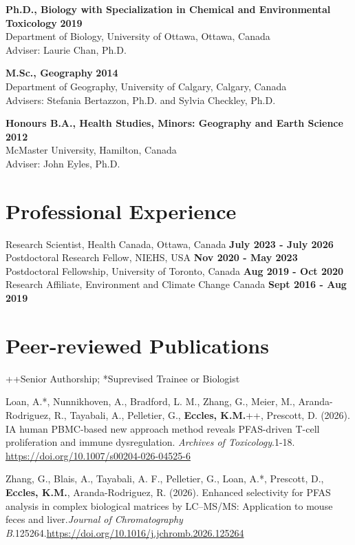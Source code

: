 \documentclass[margin,line]{res}
\begin{document}
\begin{resume}
\textbf{Ph.D., Biology with Specialization in Chemical and Environmental Toxicology} \hfill {\bf 2019}\\
Department of Biology, University of Ottawa, Ottawa, Canada \\
Adviser: Laurie Chan, Ph.D.

\textbf{M.Sc., Geography}  \hfill {\bf 2014}\\
Department of Geography, University of Calgary, Calgary, Canada\\
Advisers:  Stefania Bertazzon, Ph.D. and Sylvia Checkley, Ph.D.

\textbf{Honours B.A., Health Studies, Minors: Geography and Earth Science }\hfill {\bf 2012}\\
McMaster University, Hamilton, Canada\\
Adviser: John Eyles, Ph.D.

\vspace*{.1in}
\section{\sc Professional Experience}
Research Scientist, Health Canada, Ottawa, Canada \hfill {\bf July 2023 - July 2026}\\
Postdoctoral Research Fellow, NIEHS, USA \hfill {\bf Nov 2020 - May 2023}\\
Postdoctoral Fellowship, University of Toronto, Canada \hfill {\bf Aug 2019 - Oct 2020}\\
Research Affiliate, Environment and Climate Change Canada \hfill {\bf Sept 2016 - Aug 2019}\\

\section{\sc Peer-reviewed Publications}

++Senior Authorship; *Suprevised Trainee or Biologist

Loan, A.*, Nunnikhoven, A., Bradford, L. M., Zhang, G., Meier, M., Aranda-Rodriguez, R., Tayabali, A., Pelletier,
G., \textbf{Eccles, K.M.}++, Prescott, D. (2026). IA human PBMC-based new approach method reveals PFAS-driven T-cell proliferation and immune dysregulation. \textit{Archives of Toxicology}.1-18. \url{https://doi.org/10.1007/s00204-026-04525-6}

Zhang, G., Blais, A., Tayabali, A. F., Pelletier, G., Loan, A.*, Prescott, D., \textbf{Eccles, K.M.}, Aranda-Rodriguez, R. (2026). Enhanced selectivity for PFAS analysis in complex biological matrices by LC–MS/MS: Application to mouse feces and liver.\textit{Journal of Chromatography B}.125264.\url{https://doi.org/10.1016/j.jchromb.2026.125264}


\end{resume}
\end{document}
